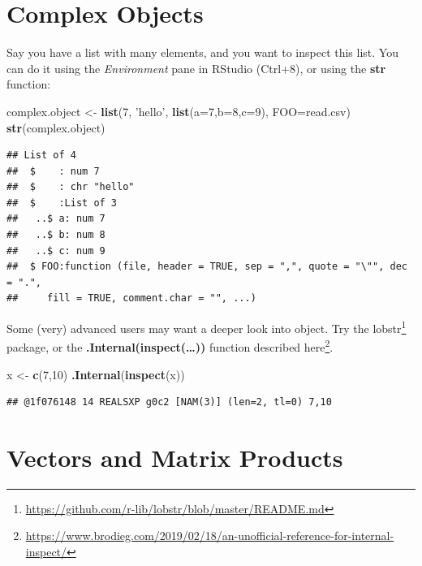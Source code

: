 \documentclass[]{book}
\newenvironment{Shaded}{\begin{snugshade}}{\end{snugshade}}
\newcommand{\DataTypeTok}[1]{\textcolor[rgb]{0.13,0.29,0.53}{#1}}
\newcommand{\DecValTok}[1]{\textcolor[rgb]{0.00,0.00,0.81}{#1}}
\newcommand{\KeywordTok}[1]{\textcolor[rgb]{0.13,0.29,0.53}{\textbf{#1}}}
\newcommand{\NormalTok}[1]{#1}
\newcommand{\StringTok}[1]{\textcolor[rgb]{0.31,0.60,0.02}{#1}}
\renewcommand{\href}[2]{#2\footnote{\url{#1}}}
\theoremstyle{definition}
\theoremstyle{definition}
\theoremstyle{definition}
\theoremstyle{remark}
\begin{document}
\hypertarget{complex-objects}{%
\section{Complex Objects}\label{complex-objects}}

Say you have a list with many elements, and you want to inspect this list.
You can do it using the \emph{Environment} pane in RStudio (Ctrl+8), or using the \textbf{str} function:

\begin{Shaded}
\begin{Highlighting}[]
\NormalTok{complex.object <-}\StringTok{ }\KeywordTok{list}\NormalTok{(}\DecValTok{7}\NormalTok{, }\StringTok{'hello'}\NormalTok{, }\KeywordTok{list}\NormalTok{(}\DataTypeTok{a=}\DecValTok{7}\NormalTok{,}\DataTypeTok{b=}\DecValTok{8}\NormalTok{,}\DataTypeTok{c=}\DecValTok{9}\NormalTok{), }\DataTypeTok{FOO=}\NormalTok{read.csv)}
\KeywordTok{str}\NormalTok{(complex.object)}
\end{Highlighting}
\end{Shaded}

\begin{verbatim}
## List of 4
##  $    : num 7
##  $    : chr "hello"
##  $    :List of 3
##   ..$ a: num 7
##   ..$ b: num 8
##   ..$ c: num 9
##  $ FOO:function (file, header = TRUE, sep = ",", quote = "\"", dec = ".", 
##     fill = TRUE, comment.char = "", ...)
\end{verbatim}

Some (very) advanced users may want a deeper look into object.
Try the \href{https://github.com/r-lib/lobstr/blob/master/README.md}{lobstr} package, or the \textbf{.Internal(inspect(\ldots{}))} function described \href{https://www.brodieg.com/2019/02/18/an-unofficial-reference-for-internal-inspect/}{here}.

\begin{Shaded}
\begin{Highlighting}[]
\NormalTok{x <-}\StringTok{ }\KeywordTok{c}\NormalTok{(}\DecValTok{7}\NormalTok{,}\DecValTok{10}\NormalTok{)}
\KeywordTok{.Internal}\NormalTok{(}\KeywordTok{inspect}\NormalTok{(x))}
\end{Highlighting}
\end{Shaded}

\begin{verbatim}
## @1f076148 14 REALSXP g0c2 [NAM(3)] (len=2, tl=0) 7,10
\end{verbatim}

\hypertarget{vectors-and-matrix-products}{%
\section{Vectors and Matrix Products}\label{vectors-and-matrix-products}}
\end{document}
